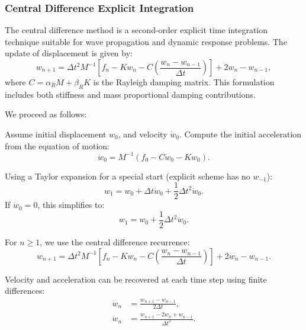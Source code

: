 \documentclass{article}
\begin{document}
	
	\subsubsection{Central Difference Explicit Integration}
	
	The central difference method is a second-order explicit time integration technique suitable for wave propagation and dynamic response problems. The update of displacement is given by:
	\begin{equation}
		{w}_{n+1} = \Delta t^2 {M}^{-1} \left[ {f}_n - {K} {w}_n - {C} \left( \frac{{w}_n - {w}_{n-1}}{\Delta t} \right) \right] + 2{w}_n - {w}_{n-1},
	\end{equation}
	where \( {C} = \alpha_R {M} + \beta_R {K} \) is the Rayleigh damping matrix. This formulation includes both stiffness and mass proportional damping contributions.
	
	We proceed as follows:
	

	Assume initial displacement \( {w}_0 \), and velocity \( \dot{{w}}_0 \). Compute the initial acceleration from the equation of motion:
	\begin{equation}
		\ddot{{w}}_0 = {M}^{-1} \left( {f}_0 - {C} \dot{{w}}_0 - {K} {w}_0 \right).
	\end{equation}
	
Using a Taylor expansion for a special start (explicit scheme has no \( {w}_{-1} \)):
	\begin{equation}
		{w}_1 = {w}_0 + \Delta t \dot{{w}}_0 + \frac{1}{2} \Delta t^2 \ddot{{w}}_0.
	\end{equation}
	If \( \dot{{w}}_0 = 0 \), this simplifies to:
	\begin{equation}
		{w}_1 = {w}_0 + \frac{1}{2} \Delta t^2 \ddot{{w}}_0.
	\end{equation}
	
For \( n \geq 1 \), we use the central difference recurrence:
	\begin{equation}
		{w}_{n+1} = \Delta t^2 {M}^{-1} \left[ {f}_n - {K} {w}_n - {C} \left( \frac{{w}_n - {w}_{n-1}}{\Delta t} \right) \right] + 2{w}_n - {w}_{n-1}.
	\end{equation}
	
Velocity and acceleration can be recovered at each time step using finite differences:
	\begin{align}
		\dot{{w}}_n &= \frac{{w}_{n+1} - {w}_{n-1}}{2\Delta t}, \\
		\ddot{{w}}_n &= \frac{{w}_{n+1} - 2{w}_n + {w}_{n-1}}{\Delta t^2}.
	\end{align}
	
\end{document}
